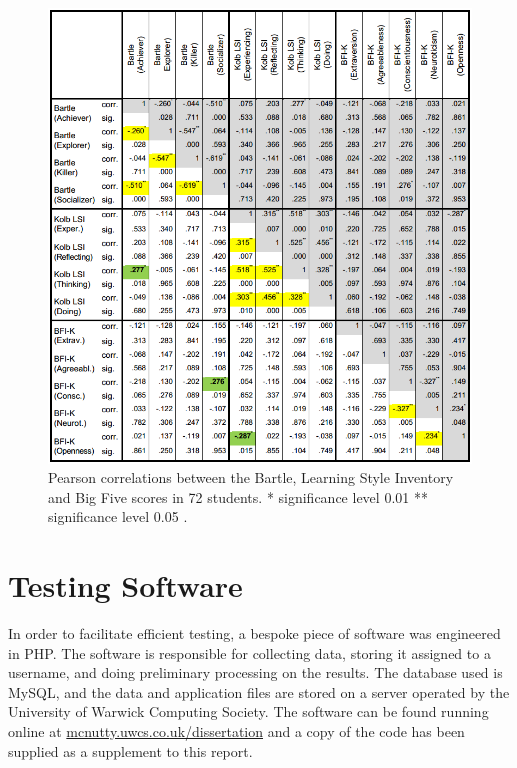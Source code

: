 \documentclass[12pt,a4paper,twoside]{report}
\begin{document}
\begin{figure}
\begin{center}
	\includegraphics[width=1\textwidth]{../img/bartle-big5.png}
	\caption{Pearson correlations between the Bartle, Learning Style Inventory and Big Five scores in 72 students. * significance level 0.01 ** significance level 0.05  \cite{konertmodeling}.}
	\label{correlation}
\end{center}
\end{figure}

\chapter{Testing Software}
\label{sec:software}
In order to facilitate efficient testing, a bespoke piece of software was engineered in PHP. The software is responsible for collecting data, storing it assigned to a username, and doing preliminary processing on the results. The database used is MySQL, and the data and application files are stored on a server operated by the University of Warwick Computing Society. The software can be found running online at \url{mcnutty.uwcs.co.uk/dissertation} and a copy of the code has been supplied as a supplement to this report.
\end{document}
